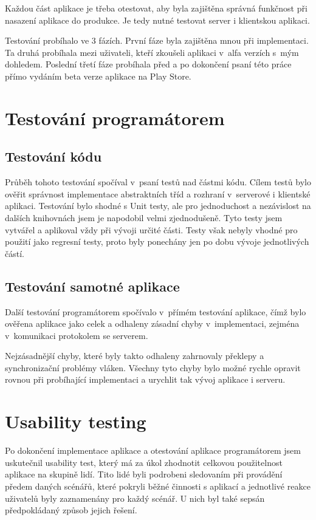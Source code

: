 \documentclass[thesis=B,czech]{FITthesis}[2013/10/20]
\begin{document}
Každou část aplikace je třeba otestovat, aby byla zajištěna správná funkčnost při nasazení aplikace do produkce. Je tedy nutné testovat server i klientskou aplikaci.

Testování probíhalo ve 3 fázích. První fáze byla zajištěna mnou při implementaci. Ta druhá probíhala mezi uživateli, kteří zkoušeli aplikaci v~alfa verzích s~mým dohledem. Poslední třetí fáze probíhala před a po dokončení psaní této práce přímo vydáním beta verze aplikace na Play Store.

\section{Testování programátorem}

\subsection{Testování kódu}

Průběh tohoto testování spočíval v~psaní testů nad částmi kódu. Cílem testů bylo ověřit správnost implementace abstraktních tříd a rozhraní v~serverové i klientské aplikaci. Testování bylo shodné s Unit testy, ale pro jednoduchost a nezávislost na dalších knihovnách jsem je napodobil velmi zjednodušeně. Tyto testy jsem vytvářel a aplikoval vždy při vývoji určité části. Testy však nebyly vhodné pro použití jako regresní testy, proto byly ponechány jen po dobu vývoje jednotlivých částí.

\subsection{Testování samotné aplikace}

Další testování programátorem spočívalo v~přímém testování aplikace, čímž bylo ověřena aplikace jako celek a odhaleny zásadní chyby v~implementaci, zejména v~komunikaci protokolem se serverem.

Nejzásadnější chyby, které byly takto odhaleny zahrnovaly překlepy a synchronizační problémy vláken. Všechny tyto chyby bylo možné rychle opravit rovnou při probíhající implementaci a urychlit tak vývoj aplikace i serveru.

\section{Usability testing}

Po dokončení implementace aplikace a otestování aplikace programátorem jsem uskutečnil usability test, který má za úkol zhodnotit celkovou použitelnost aplikace na skupině lidí. Tito lidé byli podrobeni sledovaním při provádění předem daných scénářů, které pokryli běžné činnosti s aplikací a jednotlivé reakce uživatelů byly zaznamenány pro každý scénář. U nich byl také sepsán předpokládaný způsob jejich řešení.
\end{document}
